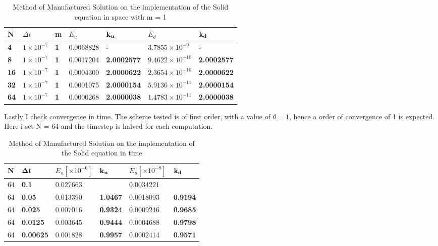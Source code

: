 \begin{table}[H]
\centering
\caption{Method of Manufactured Solution on the implementation of the Solid equation in space with m = 1}
\label{tab:MMS_SOLID_SPACE}
\begin{tabular}{|l|l|l|l|l|l|l|}
\hline
\textbf{N} & $\Delta t$ & \textbf{m} & $E_u $ & $\bold{k_u}$ & $E_d $ & $\bold{k_d}$ \\ \hline
\textbf{4} & $1\times10^{-7}$ & \textbf{1} & 0.0068828 & \textbf{-} & $3.7855 \times 10^{-9} $ & \textbf{-} \\ \hline
\textbf{8} & $1\times10^{-7}$ & \textbf{1} & 0.0017204 & \textbf{2.0002577} & $9.4622 \times 10^{-10} $ & \textbf{2.0002577} \\ \hline
\textbf{16} & $1\times10^{-7}$ & \textbf{1} & 0.0004300 & \textbf{2.0000622} & $2.3654 \times 10^{-10} $ & \textbf{2.0000622} \\ \hline
\textbf{32} & $1\times10^{-7}$ & \textbf{1} & 0.0001075 & \textbf{2.0000154} & $5.9136 \times 10^{-11} $ & \textbf{2.0000154} \\ \hline
\textbf{64} & $1\times10^{-7}$ & \textbf{1} & 0.0000268 & \textbf{2.0000038} & $1.4783 \times 10^{-11} $ & \textbf{2.0000038} \\ \hline
\end{tabular}
\end{table}

Lastly I check convergence in time. The scheme tested is of first order, with a value of $\theta = 1$, hence a order of convergence of 1 is expected. Here i set N = 64 and the timestep is halved for each computation.

\begin{table}[H]
\centering
\caption{Method of Manufactured Solution on the implementation of the Solid equation in time}
\label{tab:MMS_SOLID_TIME}
\begin{tabular}{|l|l|l|l|l|l|}
\hline
N & $\bold{\Delta t}$ & $E_u [\times10^{-6}]$ & $\bold{k_u}$ & $E_u [\times10^{-8}]$ & $\bold{k_d}$ \\ \hline
64 & \textbf{0.1} & 0.027663 & \textbf{} & 0.0034221 & \textbf{} \\ \hline
64 & \textbf{0.05} & 0.013390 & \textbf{1.0467} & 0.0018093 & \textbf{0.9194} \\ \hline
64 & \textbf{0.025} & 0.007016 & \textbf{0.9324} & 0.0009246 & \textbf{0.9685} \\ \hline
64 & \textbf{0.0125} & 0.003645 & \textbf{0.9444} & 0.0004688 & \textbf{0.9798} \\ \hline
64 & \textbf{0.00625} & 0.001828 & \textbf{0.9957} & 0.0002414 & \textbf{0.9571} \\ \hline
\end{tabular}
\end{table}

